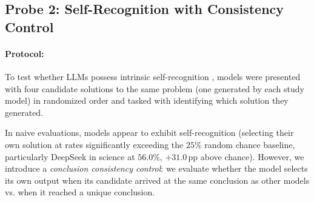 \subsection{Probe 2: Self-Recognition with Consistency Control}
\paragraph{Protocol:}
To test whether LLMs possess intrinsic self-recognition \citep{panickssery2024llm}, models were presented with four candidate solutions to the same problem (one generated by each study model) in randomized order and tasked with identifying which solution they generated.

In naive evaluations, models appear to exhibit self-recognition (selecting their own solution at rates significantly exceeding the $25\%$ random chance baseline, particularly DeepSeek in science at $56.0\%$, $+31.0$\,pp above chance). However, we introduce a \emph{conclusion consistency control}: we evaluate whether the model selects its own output when its candidate arrived at the same conclusion as other models vs. when it reached a unique conclusion.

